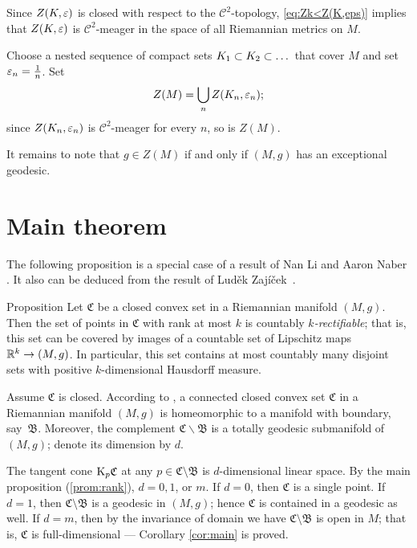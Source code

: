 \documentclass[a4paper,10pt]{article}
\begin{document}
Since $Z(K,\varepsilon)$ is closed with respect to the $\mathcal C^2$-topology, \ref{eq:Zk<Z(K,eps)} implies that $Z(K,\varepsilon)$ is $\mathcal{C}^2$-meager in the space of all Riemannian metrics on $M$.


Choose a nested sequence of compact sets $K_1\z\subset K_2\subset \dots$ that cover $M$ and set $\varepsilon_n=\tfrac1n$.
Set 
\[Z(M)=\bigcup_n Z(K_n,\varepsilon_n);\]
since $Z(K_n,\varepsilon_n)$ is $\mathcal{C}^2$-meager for every $n$, so is $Z(M)$.

It remains to note that $g\in Z(M)$ if and only if $(M,g)$ has an exceptional geodesic.
\qeds


\section{Main theorem}

The following proposition is a special case of a result of Nan Li and Aaron Naber \cite[Theorem 1.6]{li-naber}.
It also can be deduced from the result of Luděk 
Zajíček~\cite{zajicek}.

\begin{thm}{Proposition}\label{prop:rectifiable}
Let $\mathfrak{C}$ be a closed convex set in a Riemannian manifold $(M,g)$.
Then the set of points in $\mathfrak{C}$ with rank at most $k$ is countably \emph{$k$-rectifiable};
that is, this set can be  covered by images of a countable set of Lipschitz maps $\mathbb{R}^k\to (M,g)$.
In particular, this set contains at most countably many disjoint sets with positive $k$-dimensional Hausdorff measure.
\end{thm}

Assume $\mathfrak{C}$ is closed.
According to \cite[Theorem 1.6]{cheeger-gromoll}, a connected closed convex set $\mathfrak{C}$ in a Riemannian manifold $(M,g)$ is homeomorphic to a manifold with boundary, say~$\mathfrak{B}$.
Moreover, the complement $\mathfrak{C}\backslash \mathfrak{B}$ is a totally geodesic submanifold of $(M,g)$; denote its dimension by $d$.

The tangent cone $\mathrm{K}_p \mathfrak C$ at any $p \in \mathfrak C\setminus \mathfrak B$ is $d$-dimensional linear space.
By the main proposition (\ref{prom:rank}), $d=0, 1$, or $m$.
If $d=0$, then $\mathfrak{C}$ is a single point.
If $d=1$, then $\mathfrak C\setminus \mathfrak B$ is a  geodesic in $(M,g)$;
hence $\mathfrak C$ is contained in a  geodesic as well.
If $d=m$, then by the invariance of domain we have  $\mathfrak C\setminus \mathfrak B$ is open in $M$; that is, $\mathfrak C$ is full-dimensional --- Corollary 
\ref{cor:main} is proved.
\end{document}
